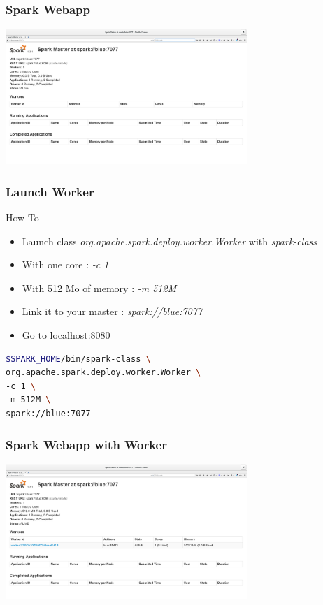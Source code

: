 \documentclass[slidetop,9pt,utf8]{beamer}
\begin{document}
\begin{CJK}{UTF8}{gbsn}
\begin{frame}
  \frametitle{Spark Webapp}

  \includegraphics[width=345px]{images/spark_webapp.png}

\end{frame}

\begin{frame}[fragile]

  \frametitle{Launch Worker}

  \begin{block}{How To}
    \begin{itemize}
      \item Launch class \textit{org.apache.spark.deploy.worker.Worker} with \textit{spark-class}
      \item With one core : \textit{-c 1}
      \item With 512 Mo of memory : \textit{-m 512M}
      \item Link it to your master : \textit{spark://blue:7077}
      \item Go to localhost:8080
    \end{itemize}
  \end{block}

  \begin{lstlisting}[language=bash, style=terminal-large]
$SPARK_HOME/bin/spark-class \
org.apache.spark.deploy.worker.Worker \
-c 1 \
-m 512M \
spark://blue:7077
  \end{lstlisting} 

\end{frame}

\begin{frame}

  \frametitle{Spark Webapp with Worker}

  \includegraphics[width=345px]{images/spark_webapp_with_worker.png}


\end{frame}
\end{CJK}
\end{document}
